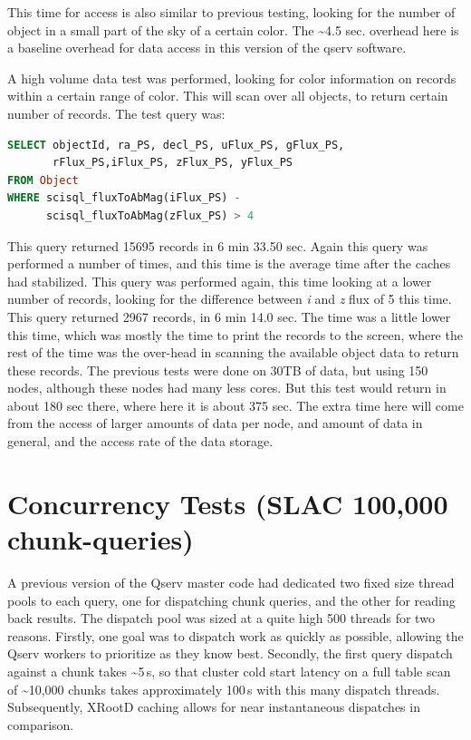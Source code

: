 \documentclass[DM,toc]{lsstdoc}
\begin{document}
This time for access is also similar to previous testing, looking for
the number of object in a small part of the sky of a certain color. The
\textasciitilde{}4.5 sec. overhead here is a baseline overhead for data
access in this version of the qserv software.

A high volume data test was performed, looking for color information on
records within a certain range of color. This will scan over all
objects, to return certain number of records. The test query was:

\begin{lstlisting}[language=SQL]
SELECT objectId, ra_PS, decl_PS, uFlux_PS, gFlux_PS,
       rFlux_PS,iFlux_PS, zFlux_PS, yFlux_PS
FROM Object
WHERE scisql_fluxToAbMag(iFlux_PS) -
      scisql_fluxToAbMag(zFlux_PS) > 4
\end{lstlisting}

This query returned 15695 records in 6 min 33.50 sec. Again this query
was performed a number of times, and this time is the average time after
the caches had stabilized. This query was performed again, this time
looking at a lower number of records, looking for the difference between
\emph{i} and \emph{z} flux of 5 this time. This query returned 2967
records, in 6 min 14.0 sec. The time was a little lower this time, which
was mostly the time to print the records to the screen, where the rest
of the time was the over-head in scanning the available object data to
return these records. The previous tests were done on 30TB of data, but
using 150 nodes, although these nodes had many less cores. But this test
would return in about 180 sec there, where here it is about 375 sec. The
extra time here will come from the access of larger amounts of data per
node, and amount of data in general, and the access rate of the data
storage.

\section{Concurrency Tests (SLAC 100,000
chunk-queries)}\label{concurrency-tests-slac-100000-chunk-queries}

A previous version of the Qserv master code had dedicated two fixed size
thread pools to each query, one for dispatching chunk queries, and the
other for reading back results. The dispatch pool was sized at a quite
high 500 threads for two reasons. Firstly, one goal was to dispatch work
as quickly as possible, allowing the Qserv workers to prioritize as they
know best. Secondly, the first query dispatch against a chunk takes
\textasciitilde{}5\,s, so that cluster cold start latency on a full table
scan of \textasciitilde{}10,000 chunks takes approximately 100\,s with
this many dispatch threads. Subsequently,
XRootD caching allows for near instantaneous
dispatches in comparison.
\end{document}
